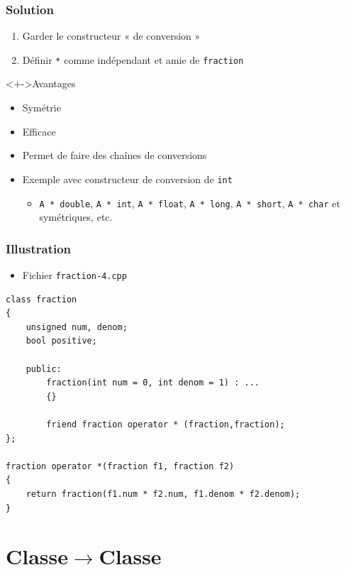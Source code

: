 \begin{frame}
\frametitle{Solution}
\begin{enumerate}[<+->]
\item Garder le constructeur « de conversion »
\item Définir \texttt{*} comme indépendant et amie de \texttt{fraction}
\end{enumerate}
\begin{exampleblock}<+->{Avantages}
	\begin{itemize}[<+->]
	\item Symétrie
	\item Efficace
	\item Permet de faire des chaînes de conversions
	\end{itemize}
\end{exampleblock}
\begin{itemize}[<+->]
\item Exemple avec constructeur de conversion de \lstinline|int|
	\begin{itemize}
	\item \lstinline|A * double|, \lstinline|A * int|, \lstinline|A * float|, \lstinline|A * long|, \lstinline|A * short|, \lstinline|A * char| et symétriques, etc.
	\end{itemize}
\end{itemize}
\end{frame}

\begin{frame}[containsverbatim]
\frametitle{Illustration}
\begin{itemize}
\item Fichier \texttt{fraction-4.cpp}
\end{itemize}
\begin{lstlisting}
class fraction
{
	unsigned num, denom;
	bool positive;

	public:
		fraction(int num = 0, int denom = 1) : ...
		{}				
    
        friend fraction operator * (fraction,fraction);
};

fraction operator *(fraction f1, fraction f2)
{
    return fraction(f1.num * f2.num, f1.denom * f2.denom);   
}
\end{lstlisting}
\end{frame}

\section{Classe$\rightarrow$Classe}


